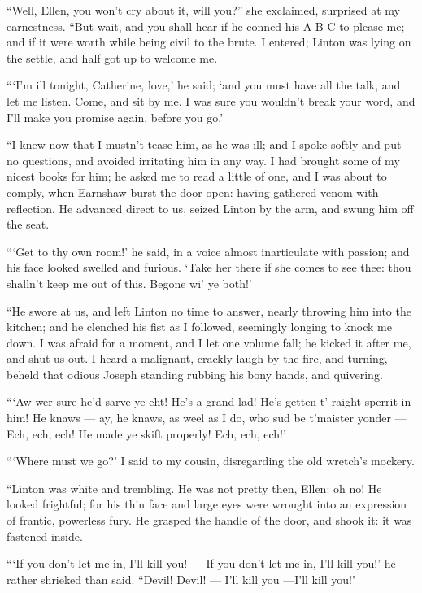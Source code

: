 \par “Well, Ellen, you won't cry about it, will you?” she exclaimed, surprised at my earnestness. “But wait, and you shall hear if he conned his A B C to please me; and if it were worth while being civil to the brute. I entered; Linton was lying on the settle, and half got up to welcome me.
\par “‘I'm ill tonight, Catherine, love,’ he said; ‘and you must have all the talk, and let me listen. Come, and sit by me. I was sure you wouldn't break your word, and I'll make you promise again, before you go.’
\par “I knew now that I mustn't tease him, as he was ill; and I spoke softly and put no questions, and avoided irritating him in any way. I had brought some of my nicest books for him; he asked me to read a little of one, and I was about to comply, when Earnshaw burst the door open: having gathered venom with reflection. He advanced direct to us, seized Linton by the arm, and swung him off the seat.
\par “‘Get to thy own room!’ he said, in a voice almost inarticulate with passion; and his face looked swelled and furious. ‘Take her there if she comes to see thee: thou shalln't keep me out of this. Begone wi' ye both!’
\par “He swore at us, and left Linton no time to answer, nearly throwing him into the kitchen; and he clenched his fist as I followed, seemingly longing to knock me down. I was afraid for a moment, and I let one volume fall; he kicked it after me, and shut us out. I heard a malignant, crackly laugh by the fire, and turning, beheld that odious Joseph standing rubbing his bony hands, and quivering.
\par “‘Aw wer sure he'd sarve ye eht! He's a grand lad! He's getten t' raight sperrit in him! He knaws — ay, he knaws, as weel as I do, who sud be t'maister yonder — Ech, ech, ech! He made ye skift properly! Ech, ech, ech!’
\par “‘Where must we go?’ I said to my cousin, disregarding the old wretch's mockery.
\par “Linton was white and trembling. He was not pretty then, Ellen: oh no! He looked frightful; for his thin face and large eyes were wrought into an expression of frantic, powerless fury. He grasped the handle of the door, and shook it: it was fastened inside.
\par “‘If you don't let me in, I'll kill you! — If you don't let me in, I'll kill you!’ he rather shrieked than said. “Devil! Devil! — I'll kill you —I'll kill you!’
